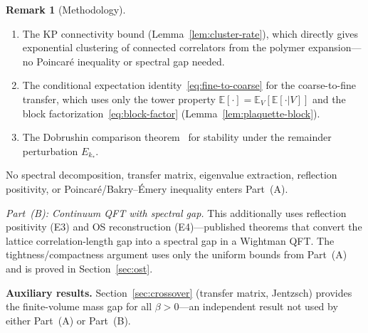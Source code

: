 \documentclass[11pt]{article}
\theoremstyle{definition}
\newtheorem{remark}[theorem]{Remark}
\begin{document}
\begin{remark}[Methodology]
\begin{enumerate}[nosep]
\emph{Critical clarification on reflection positivity.}
The exponential clustering in Part~(A) is proved for
correlators of the \textbf{original Wilson lattice measure}
$\mu_\beta=e^{-\beta S_W}\prod dU_\ell/Z$.
The RG/cluster expansion is an \emph{analytic tool} for
establishing this decay; the final statement is about $\mu_\beta$
itself, not about any modified or effective measure.
Specifically: the coarse-lattice effective measure at $\beta_*$
is the exact marginal of $\mu_\beta$ on coarse-lattice variables
(obtained by integrating out fine-lattice variables).
Exponential clustering of this marginal implies exponential
clustering of $\mu_\beta$ for observables that depend only on
coarse-lattice variables, which includes all gauge-invariant
observables at physical separations $\ge\ell_*$.
The reflection positivity used in Part~(B) is that of
$\mu_\beta$ (Wilson action), not of any effective action.
\item The KP connectivity bound (Lemma~\ref{lem:cluster-rate}),
which directly gives exponential clustering of connected
correlators from the polymer expansion---no Poincar\'e
inequality or spectral gap needed.
\item The conditional expectation identity~\eqref{eq:fine-to-coarse}
for the coarse-to-fine transfer, which uses only the tower
property $\mathbb{E}[\cdot]=\mathbb{E}_V[\mathbb{E}[\cdot|V]]$
and the block factorization~\eqref{eq:block-factor}
(Lemma~\ref{lem:plaquette-block}).
\item The Dobrushin comparison theorem~\cite{Dobrushin} for
stability under the remainder perturbation $E_{k_*}$.
\end{enumerate}
No spectral decomposition, transfer matrix, eigenvalue extraction,
reflection positivity, or Poincar\'e/Bakry--\'Emery inequality
enters Part~(A).

\emph{Part~(B): Continuum QFT with spectral gap.}
This additionally uses reflection positivity (E3) and
OS reconstruction (E4)---published theorems that convert the
lattice correlation-length gap into a spectral gap in a
Wightman QFT.  The tightness/compactness argument uses
only the uniform bounds from Part~(A) and is proved in
Section~\ref{sec:ost}.

\textbf{Auxiliary results.}
Section~\ref{sec:crossover}
(transfer matrix, Jentzsch) provides the finite-volume
mass gap for all $\beta>0$---an independent result not
used by either Part~(A) or Part~(B).
\end{remark}
\end{document}
